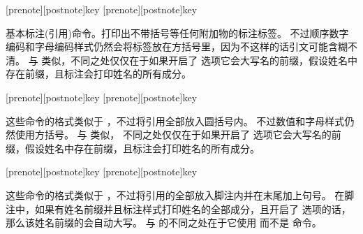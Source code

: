 \begin{ltxsyntax}


[prenote][postnote]{key}
[prenote][postnote]{key}


基本标注(引用)命令。打印出不带括号等任何附加物的标注标签。
不过顺序数字编码和字母编码样式仍然会将标签放在方括号里，因为不这样的话引文可能含糊不清。
 与  类似，不同之处仅仅在于如果开启了  选项它会大写名的前缀，假设姓名中存在前缀，且标注会打印姓名的所有成分。

[prenote][postnote]{key}
[prenote][postnote]{key}


这些命令的格式类似于 ，不过将引用全部放入圆括号内。
不过数值和字母样式仍然使用方括号。 与  类似，
不同之处仅仅在于如果开启了  选项它会大写名的前缀，假设姓名中存在前缀，且标注会打印姓名的所有成分。

[prenote][postnote]{key}
[prenote][postnote]{key}


这些命令的格式类似于 ，不过将引用的全部放入脚注内并在末尾加上句号。
在脚注中，如果有姓名前缀并且标注样式打印姓名的全部成分，且开启了  选项的话，那么该姓名前缀的会自动大写。
 与  的不同之处在于它使用  而不是  命令。

\end{ltxsyntax}

